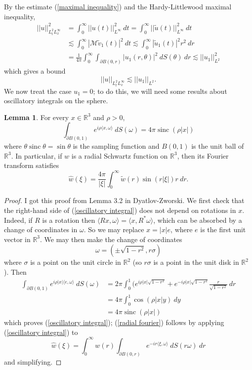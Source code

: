 \documentclass[10pt]{article}
\newcommand{\RR}{\mathbb{R}}
\DeclareMathOperator{\sinc}{sinc}
\theoremstyle{definition}
\newtheorem{lemma}{Lemma}[exer]
\begin{document}
By the estimate (\ref{maximal inequality}) and the Hardy-Littlewood maximal inequality,
\begin{align*}
||u||_{L^2_tL^\infty_x}^2 &= \int_0^\infty ||u(t)||_{L^\infty}^2~dt
= \int_0^\infty ||\tilde u(t)||_{L^\infty}^2~dt \\
&\lesssim \int_0^\infty |\mathcal M\tilde v_1(t)|^2~dt
\lesssim \int_0^\infty |\tilde u_1(t)|^2 r^2~dr \\
&= \frac{1}{4\pi} \int_0^\infty \int_{\partial B(0, r)} |u_1(r, \theta)|^2 ~dS(\theta)~dr
\lesssim ||u_1||_{L^2}^2
\end{align*}
which gives a bound
$$||u||_{L^2_tL^\infty_x} \lesssim ||u_1||_{L^2}.$$
We now treat the case $u_1 = 0$; to do this, we will need some results about oscillatory integrals on the sphere.

\begin{lemma}
For every $x \in \RR^3$ and $\rho > 0$,
\begin{equation}
\label{oscillatory integral}
\int_{\partial B(0, 1)} e^{i\rho\langle x, \omega\rangle} ~dS(\omega) = 4\pi \sinc(\rho |x|)
\end{equation}
where $\theta \sinc \theta = \sin \theta$ is the sampling function and $B(0, 1)$ is the unit ball of $\RR^3$.
In particular, if $w$ is a radial Schwartz function on $\RR^3$, then its Fourier transform satisfies
\begin{equation}
\label{radial fourier}
\hat w(\xi) = \frac{4\pi}{|\xi|} \int_0^\infty \tilde w(r) \sin(r|\xi|) r~dr.
\end{equation}
\end{lemma}
\begin{proof}
I got this proof from Lemma 3.2 in Dyatlov-Zworski.
We first check that the right-hand side of (\ref{oscillatory integral}) does not depend on rotations in $x$. Indeed, if $R$ is a rotation then $\langle Rx, \omega\rangle = \langle x, R^*\omega\rangle$, which can be absorbed by a change of coordinates in $\omega$.
So we may replace $x = |x|e$, where $e$ is the first unit vector in $\RR^3$.
We may then make the change of coordinates
$$\omega = (\pm \sqrt{1 - r^2}, r\sigma)$$
where $\sigma$ is a point on the unit circle in $\RR^2$ (so $r\sigma$ is a point in the unit disk in $\RR^2$).
Then
\begin{align*}
\int_{\partial B(0, 1)} e^{i\rho|x|\langle e, \omega\rangle} ~dS(\omega) &= 2\pi \int_0^1 (e^{i\rho|x|\sqrt{1 - r^2}} + e^{-i\rho|x|\sqrt{1 - r^2}} \frac{r}{\sqrt{1 - r^2}}~dr\\
&= 4\pi \int_0^1 \cos(\rho|x| y) ~dy\\
&= 4\pi \sinc(\rho |x|)
\end{align*}
which proves (\ref{oscillatory integral}); (\ref{radial fourier}) follows by applying (\ref{oscillatory integral}) to
$$\hat w(\xi) = \int_0^\infty w(r) \int_{\partial B(0, r)} e^{-ir\langle\xi, \omega\rangle}~dS(r\omega) ~dr$$
and simplifying.
\end{proof}
\end{document}
